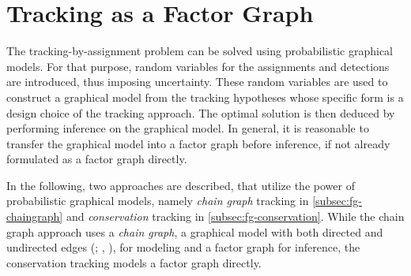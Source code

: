 \section{Tracking as a Factor Graph}
\label{sec:tracking-as-a-factor-graph}
The tracking-by-assignment problem can be solved using probabilistic graphical models. For that
purpose, random variables for the assignments and detections are introduced, thus imposing
uncertainty. These random variables are used to construct a graphical model from the tracking
hypotheses whose specific form is a design choice of the tracking approach. The optimal solution is
then deduced by performing inference on the graphical model. In general, it is reasonable to
transfer the graphical model into a factor graph before inference, if not already formulated as a
factor graph directly.

In the following, two approaches are described, that utilize the power of probabilistic graphical
models, namely \emph{chain graph} tracking in \cref{subsec:fg-chaingraph} and \emph{conservation}
tracking in \cref{subsec:fg-conservation}. While the chain graph approach uses a \emph{chain graph},
\ie a graphical model with both directed and undirected edges
(\citealp[Chapter~4.1.5]{kausler_13_tracking};
\citealp[Chapter~4.6.2]{koller_09_probabilistic},
\citealp{frydenberg_90_chain}), for modeling and a factor graph for inference, the
conservation tracking models a factor graph directly.





